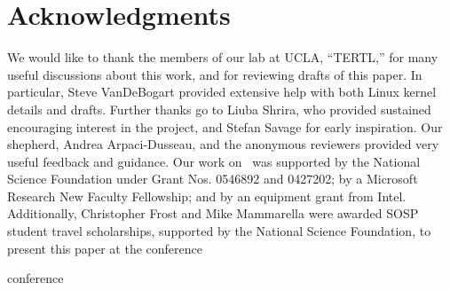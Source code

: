 \section*{Acknowledgments}

We would like to thank the members of our lab at UCLA, ``TERTL,'' for many
useful discussions about this work, and for reviewing drafts of this paper. In
particular, Steve VanDeBogart provided extensive help with both Linux
kernel details and drafts. Further thanks go to Liuba
Shrira, who provided sustained encouraging interest in the project, and
Stefan Savage for early inspiration.
Our shepherd, Andrea Arpaci-Dusseau, and the anonymous reviewers
provided very useful feedback and guidance.
%
Our work on \Kudos\ was supported by the National Science
 Foundation under Grant Nos. 0546892 and 0427202; by a Microsoft Research
 New Faculty Fellowship; and by an equipment grant from Intel.
%
Additionally, Christopher Frost and Mike Mammarella were awarded SOSP student
travel scholarships, supported by the National Science Foundation, to present
this paper at the
\ifpdf
conference

\else
conference

\fi


